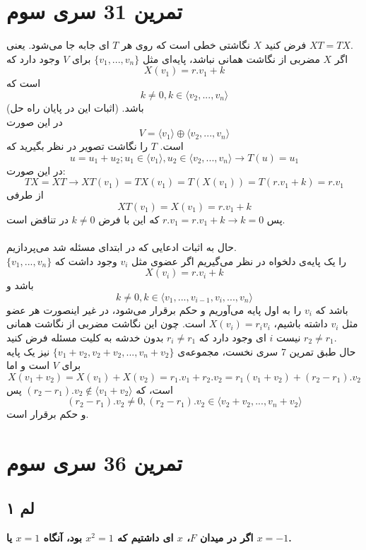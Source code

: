 \documentclass[12pt,a4paper]{article}
\begin{document}
\section{تمرین 31 سری سوم}
فرض کنید $X$ نگاشتی خطی است که روی هر $T$ ای جابه جا می‌شود. یعنی $XT = TX$.
\\
اگر $X$ مضربی از نگاشت همانی نباشد، پایه‌ای مثل 
$\{v_1, ..., v_n\}$
برای $V$ وجود دارد که 
$$X(v_1) = r.v_1 + k$$
است که 
$$k \neq 0, k \in \langle v_2, ..., v_n\rangle$$
باشد. (اثبات این در پایان راه حل)
\\
در این صورت
$$V = \langle v_1 \rangle \oplus \langle v_2, ..., v_n \rangle$$
است. $T$ را نگاشت تصویر در نظر بگیرید که
$$u = u_1 + u_2; u_1 \in \langle v_1 \rangle, u_2 \in \langle v_2, ..., v_n \rangle \rightarrow T(u) = u_1$$
در این صورت:
$$TX = XT \rightarrow XT(v_1) = TX(v_1) = T(X(v_1)) = T(r.v_1 + k) = r.v_1$$
از طرفی
$$XT(v_1) = X(v_1) = r.v_1 + k$$
پس
$r.v_1 = r.v_1 + k \rightarrow k = 0$
که این با فرض $k \neq 0$ در تناقض است.
\\
\\
حال به اثبات ادعایی که در ابتدای مسئله شد می‌پردازیم.
\\
$\{v_1, ..., v_n\}$
را یک پایه‌ی دلخواه در نظر می‌گیریم اگر عضوی مثل $v_i$ وجود داشت که 
$$X(v_i) = r.v_i + k$$
باشد و 
$$k \neq 0, k \in \langle v_1, ..., v_{i-1}, v_{i}, ..., v_n\rangle$$
باشد که $v_i$ را به اول پایه می‌آوریم و حکم برقرار می‌شود، در غیر اینصورت هر عضو مثل $v_i$ داشته باشیم، 
$X(v_i) = r_i v_i$
است. چون این نگاشت مضربی از نگاشت همانی نیست $i$ ای وجود دارد که
$r_i \neq r_1$
بدون خدشه به کلیت مسئله فرض کنید $r_2 \neq r_1$.
\\
حال طبق تمرین 7 سری نخست، مجموعه‌ی 
$\{v_1 + v_2, v_2 + v_2, ..., v_n + v_2\}$
نیز یک پایه برای $V$ است و اما
$$X(v_1 + v_2) = X(v_1) + X(v_2) = r_1.v_1 + r_2.v_2 = r_1(v_1 + v_2) + (r_2 - r_1). v_2$$
است، که 
$(r_2 - r_1). v_2 \notin \langle v_1 + v_2 \rangle$
پس 
$$(r_2 - r_1). v_2 \neq 0, (r_2 - r_1). v_2 \in \langle v_2 + v_2, ..., v_n + v_2 \rangle$$
 و حکم برقرار است.
 
\section{تمرین 36 سری سوم}
\subsection{لم ۱}
\textbf{اگر در میدان $F$،
$x$
ای داشتیم که
$x^2 = 1$
بود، آنگاه $x=1$ یا $x=-1$.}
\end{document}
